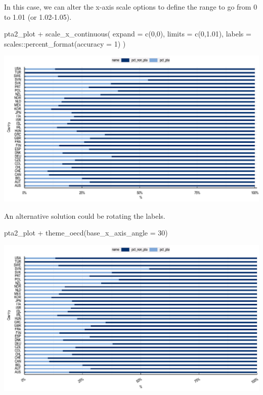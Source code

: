 \documentclass[
  11pt,
  oneside]{report}
\newenvironment{Shaded}{\begin{snugshade}}{\end{snugshade}}
\newcommand{\AttributeTok}[1]{\textcolor[rgb]{0.77,0.63,0.00}{#1}}
\newcommand{\DecValTok}[1]{\textcolor[rgb]{0.00,0.00,0.81}{#1}}
\newcommand{\FloatTok}[1]{\textcolor[rgb]{0.00,0.00,0.81}{#1}}
\newcommand{\FunctionTok}[1]{\textcolor[rgb]{0.00,0.00,0.00}{#1}}
\newcommand{\NormalTok}[1]{#1}
\newcommand{\SpecialCharTok}[1]{\textcolor[rgb]{0.00,0.00,0.00}{#1}}
\begin{document}
In this case, we can alter the x-axis scale options to define the range
to go from 0 to 1.01 (or 1.02-1.05).

\begin{Shaded}
\begin{Highlighting}[]
\NormalTok{pta2\_plot }\SpecialCharTok{+}
  \FunctionTok{scale\_x\_continuous}\NormalTok{(}
    \AttributeTok{expand =} \FunctionTok{c}\NormalTok{(}\DecValTok{0}\NormalTok{,}\DecValTok{0}\NormalTok{), }
    \AttributeTok{limits =} \FunctionTok{c}\NormalTok{(}\DecValTok{0}\NormalTok{,}\FloatTok{1.01}\NormalTok{),}
    \AttributeTok{labels =}\NormalTok{ scales}\SpecialCharTok{::}\FunctionTok{percent\_format}\NormalTok{(}\AttributeTok{accuracy =} \DecValTok{1}\NormalTok{)}
\NormalTok{  )}
\end{Highlighting}
\end{Shaded}

\begin{center}\includegraphics{book_figures/whatif_offmargin_4-1} \end{center}

An alternative solution could be rotating the labels.

\begin{Shaded}
\begin{Highlighting}[]
\NormalTok{pta2\_plot }\SpecialCharTok{+}
  \FunctionTok{theme\_oecd}\NormalTok{(}\AttributeTok{base\_x\_axis\_angle =} \DecValTok{30}\NormalTok{)}
\end{Highlighting}
\end{Shaded}

\begin{center}\includegraphics{book_figures/whatif_offmargin_5-1} \end{center}
\end{document}
